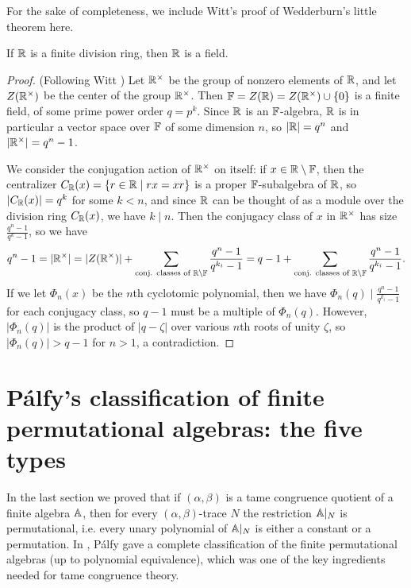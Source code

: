 \begin{appendices}
For the sake of completeness, we include Witt's proof of Wedderburn's little theorem here.

\begin{thm}\label{thm-wedderburn-little} If $\mathbb{R}$ is a finite division ring, then $\mathbb{R}$ is a field.
\end{thm}
\begin{proof} (Following Witt \cite{witt-wedderburn-little}) Let $\mathbb{R}^\times$ be the group of nonzero elements of $\mathbb{R}$, and let $Z(\mathbb{R}^\times)$ be the center of the group $\mathbb{R}^\times$. Then $\mathbb{F} = Z(\mathbb{R}) = Z(\mathbb{R}^\times) \cup \{0\}$ is a finite field, of some prime power order $q = p^k$. Since $\mathbb{R}$ is an $\mathbb{F}$-algebra, $\mathbb{R}$ is in particular a vector space over $\mathbb{F}$ of some dimension $n$, so $|\mathbb{R}| = q^n$ and $|\mathbb{R}^\times| = q^n-1$.

We consider the conjugation action of $\mathbb{R}^\times$ on itself: if $x \in \mathbb{R} \setminus \mathbb{F}$, then the centralizer $C_{\mathbb{R}}(x) = \{r \in \mathbb{R} \mid rx = xr\}$ is a proper $\mathbb{F}$-subalgebra of $\mathbb{R}$, so $|C_{\mathbb{R}}(x)| = q^k$ for some $k < n$, and since $\mathbb{R}$ can be thought of as a module over the division ring $C_{\mathbb{R}}(x)$, we have $k \mid n$. Then the conjugacy class of $x$ in $\mathbb{R}^\times$ has size $\frac{q^n-1}{q^k-1}$, so we have
\[
q^n-1 = |\mathbb{R}^\times| = |Z(\mathbb{R}^\times)| + \sum_{\text{conj. classes of }\mathbb{R}\setminus\mathbb{F}} \frac{q^n-1}{q^{k_i}-1} = q-1 + \sum_{\text{conj. classes of }\mathbb{R}\setminus\mathbb{F}} \frac{q^n-1}{q^{k_i}-1}.
\]
If we let $\Phi_n(x)$ be the $n$th cyclotomic polynomial, then we have $\Phi_n(q) \mid \frac{q^n-1}{q^{k_i}-1}$ for each conjugacy class, so $q-1$ must be a multiple of $\Phi_n(q)$. However, $|\Phi_n(q)|$ is the product of $|q-\zeta|$ over various $n$th roots of unity $\zeta$, so $|\Phi_n(q)| > q-1$ for $n > 1$, a contradiction.
\end{proof}




\section{P\'alfy's classification of finite permutational algebras: the five types}

In the last section we proved that if $(\alpha,\beta)$ is a tame congruence quotient of a finite algebra $\mathbb{A}$, then for every $(\alpha,\beta)$-trace $N$ the restriction $\mathbb{A}|_N$ is permutational, i.e. every unary polynomial of $\mathbb{A}|_N$ is either a constant or a permutation. In \cite{palfy-permutational}, P\'alfy gave a complete classification of the finite permutational algebras (up to polynomial equivalence), which was one of the key ingredients needed for tame congruence theory.


\end{appendices}
